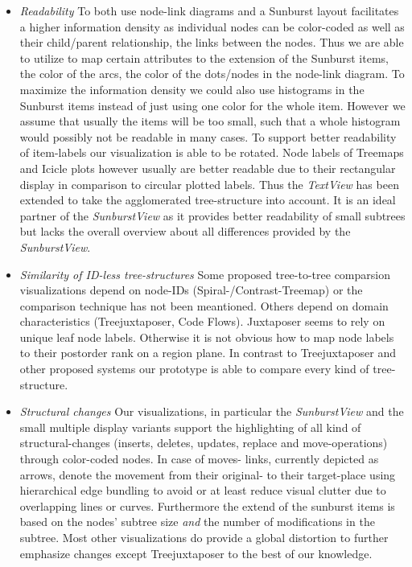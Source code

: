 \begin{itemize}
\item \emph{Readability} To both use node-link diagrams and a Sunburst layout facilitates a higher information density as individual nodes can be color-coded as well as their child/parent relationship, the links between the nodes. Thus we are able to utilize to map certain attributes to the extension of the Sunburst items, the color of the arcs, the color of the dots/nodes in the node-link diagram. To maximize the information density we could also use histograms in the Sunburst items instead of just using one color for the whole item. However we assume that usually the items will be too small, such that a whole histogram would possibly not be readable in many cases. To support better readability of item-labels our visualization is able to be rotated. Node labels of Treemaps and Icicle plots however usually are better readable due to their rectangular display in comparison to circular plotted labels. Thus the \emph{TextView} has been extended to take the agglomerated tree-structure into account. It is an ideal partner of the \emph{SunburstView} as it provides better readability of small subtrees but lacks the overall overview about all differences provided by the \emph{SunburstView}. 
\item \emph{Similarity of ID-less tree-structures} Some proposed tree-to-tree comparsion visualizations depend on node-IDs (Spiral-/Contrast-Treemap\cite{tu2007visualizing}) or the comparison technique has not been meantioned. Others depend on domain characteristics (Treejuxtaposer\cite{munzner2003treejuxtaposer}, Code Flows\cite{telea2008code}). Juxtaposer seems to rely on unique leaf node labels. Otherwise it is not obvious how to map node labels to their postorder rank on a region plane. In contrast to Treejuxtaposer and other proposed systems our prototype is able to compare every kind of tree-structure.
\item \emph{Structural changes} Our visualizations, in particular the \emph{SunburstView} and the small multiple display variants support the highlighting of all kind of structural-changes (inserts, deletes, updates, replace and move-operations) through color-coded nodes. In case of moves- links, currently depicted as arrows, denote the movement from their original- to their target-place using hierarchical edge bundling to avoid or at least reduce visual clutter due to overlapping lines or curves. Furthermore the extend of the sunburst items is based on the nodes' subtree size \emph{and} the number of modifications in the subtree. Most other visualizations do provide a global distortion to further emphasize changes except Treejuxtaposer to the best of our knowledge.

\end{itemize}

